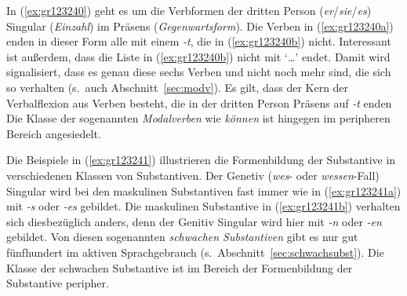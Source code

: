 In (\ref{ex:gr123240}) geht es um die Verbformen der dritten Person (\textit{er}\slash\textit{sie}\slash\textit{es}) Singular (\textit{Einzahl}) im Präsens (\textit{Gegenwartsform}).
Die Verben in (\ref{ex:gr123240a}) enden in dieser Form alle mit einem \textit{-t}, die in (\ref{ex:gr123240b}) nicht.
Interessant ist außerdem, dass die Liste in (\ref{ex:gr123240b}) nicht mit `\textit{\ldots}' endet.
Damit wird signalisiert, dass es genau diese sechs Verben und nicht noch mehr sind, die sich so verhalten (s.\ auch Abschnitt~\ref{sec:modv}).
Es gilt, dass der Kern der Verbalflexion aus Verben besteht, die in der dritten Person Präsens auf \textit{-t} enden
Die Klasse der sogenannten \textit{Modalverben} wie \textit{können} ist hingegen im peripheren Bereich angesiedelt.


Die Beispiele in (\ref{ex:gr123241}) illustrieren die Formenbildung der Substantive in verschiedenen Klassen von Substantiven.
Der Genetiv (\textit{wes}- oder \textit{wessen}-Fall) Singular wird bei den maskulinen Substantiven fast immer wie in (\ref{ex:gr123241a}) mit \textit{-s} oder \textit{-es} gebildet.
Die maskulinen Substantive in (\ref{ex:gr123241b}) verhalten sich diesbezüglich anders, denn der Genitiv Singular wird hier mit \textit{-n} oder \textit{-en} gebildet.
Von diesen sogenannten \textit{schwachen Substantiven} gibt es nur gut fünfhundert im aktiven Sprachgebrauch (s.\ Abschnitt~\ref{sec:schwachsubst}).
Die Klasse der schwachen Substantive ist im Bereich der Formenbildung der Substantive peripher.


